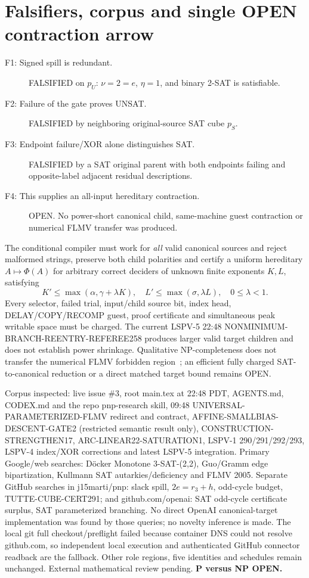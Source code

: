 \documentclass[11pt]{article}
\begin{document}
\section{Falsifiers, corpus and single OPEN contraction arrow}
\begin{description}
\item[F1: Signed spill is redundant.] FALSIFIED on $p_U$:
$\nu=2=e$, $\eta=1$, and binary 2-SAT is satisfiable.
\item[F2: Failure of the gate proves UNSAT.] FALSIFIED
by neighboring original-source SAT cube $p_S$.
\item[F3: Endpoint failure/XOR alone distinguishes SAT.] FALSIFIED
by a SAT original parent with both endpoints failing and
opposite-label adjacent residual descriptions.
\item[F4: This supplies an all-input hereditary contraction.]
OPEN. No power-short canonical child, same-machine guest
contraction or numerical FLMV transfer was produced.
\end{description}
The conditional compiler must work for \emph{all} valid canonical sources
and reject malformed strings, preserve both child polarities and certify
a uniform hereditary $A\mapsto\Phi(A)$ for arbitrary correct deciders
of unknown finite exponents $K,L$, satisfying
\[
 K'\le\max(\alpha,\gamma+\lambda K),\quad
 L'\le\max(\sigma,\lambda L),\quad 0\le\lambda<1.
\]
Every selector, failed trial, input/child source bit, index head,
DELAY/COPY/RECOMP guest, proof certificate and simultaneous peak
writable space must be charged. The current LSPV-5 22:48
NONMINIMUM-BRANCH-REENTRY-REFEREE258 produces larger valid
target children and does not establish power shrinkage.
Qualitative NP-completeness does not transfer the numerical
FLMV forbidden region~\cite{flmv}; an efficient fully charged
SAT-to-canonical reduction or a direct matched target bound
remains OPEN.

Corpus inspected: live issue \#3, root main.tex at 22:48 PDT,
AGENTS.md, CODEX.md and the repo pnp-research skill,
09:48 UNIVERSAL-PARAMETERIZED-FLMV redirect and contract,
AFFINE-SMALLBIAS-DESCENT-GATE2 (restricted semantic result only),
CONSTRUCTION-STRENGTHEN17, ARC-LINEAR22-SATURATION1,
LSPV-1 290/291/292/293, LSPV-4 index/XOR corrections and
latest LSPV-5 integration. Primary Google/web searches:
D\"ocker Monotone 3-SAT-(2,2), Guo/Gramm edge bipartization,
Kullmann SAT autarkies/deficiency and FLMV 2005.
Separate GitHub searches in j15marti/pnp:
slack spill, $2e=r_3+h$, odd-cycle budget,
TUTTE-CUBE-CERT291; and github.com/openai:
SAT odd-cycle certificate surplus, SAT parameterized branching.
No direct OpenAI canonical-target implementation was found by
those queries; no novelty inference is made.
The local git full checkout/preflight failed because container
DNS could not resolve github.com, so independent local execution
and authenticated GitHub connector readback are the fallback.
Other role regions, five identities and schedules remain unchanged.
External mathematical review pending. \textbf{P versus NP OPEN.}
\end{document}
